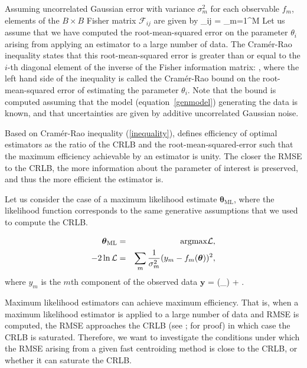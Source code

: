Assuming uncorrelated Gaussian error with variance $\sigma^{2}_{m}$ for each observable $f_{m}$, elements
of the $B\times B$ Fisher matrix $\mathcal{F}_{ij}$ are given by
\beq
{}_{ij} = \sum_{m=1}^{M}
\label{fisher}
\eeq
Let us assume that we have computed the root-mean-squared error on the parameter $\theta_{i}$ arising from applying an estimator to a large number of data. The Cram\'{e}r-Rao inequality states that this root-mean-squared error is greater than or equal to the $i$-th diagonal element of the inverse of the Fisher information matrix:
\beq
 \geq {},
\label{inequality}
\eeq
where the left hand side of the inequality is called the Cram\'{e}r-Rao bound on 
the root-mean-squared error of estimating the parameter $\theta_{i}$. Note that 
the bound is computed assuming that the model (equation~\ref{genmodel}) generating the data 
is known, and that uncertainties are given by additive uncorrelated Gaussian noise.

Based on Cram\'{e}r-Rao inequality (\ref{inequality}), \citet{crlb} defines efficiency of optimal estimators as the ratio of the CRLB and the root-mean-squared-error such that the maximum efficiency 
achievable by an estimator is unity. The closer the RMSE to the CRLB, 
the more information about the parameter of interest is preserved, and thus the more efficient the estimator is. 

Let us consider the case of a maximum likelihood estimate $\boldsymbol{\mathbf{\theta}}_{\text{ML}}$, 
where the likelihood function corresponds to the same generative assumptions that we used to compute the CRLB.

\begin{eqnarray}
\boldsymbol{\mathbf{\theta}}_{\text{ML}} &=& \mathrm{argmax} \mathcal{L}, \\
-2\ln \mathcal{L} &=& \sum_{m}\frac{1}{\sigma_{m}^{2}}( y_{m} - f_{m}(\boldsymbol{\mathbf{\theta}}))^{2}, \\
\end{eqnarray}
where $y_{m}$ is the $m$th component of the observed data $\mathbf{y}$
\beq
{} = (\boldsymbol{\mathbf{\theta}}_{}) + .
\eeq

Maximum likelihood estimators can achieve maximum efficiency. That is, when a maximum likelihood %
estimator is applied to a large number of data and RMSE is computed, the RMSE approaches the CRLB (see
\citealt{crlb}; \citealt{lecam} for proof) in which case the CRLB is saturated. Therefore, we want to investigate the conditions under which the RMSE arising from a given fast centroiding method is close to the CRLB, or whether it can saturate the CRLB.

